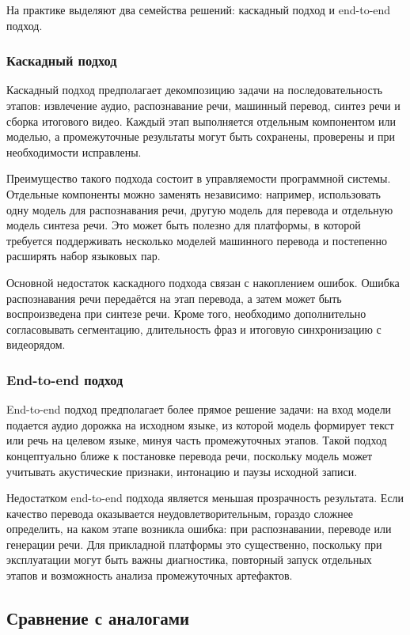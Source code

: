\documentclass[a4paper,article,14pt]{extarticle}
\begin{document}
На практике выделяют два семейства решений: каскадный подход и end-to-end подход.

\subsubsection{Каскадный подход}

Каскадный подход предполагает декомпозицию задачи на последовательность этапов: извлечение аудио, распознавание речи, машинный перевод, синтез речи и сборка итогового видео. Каждый этап выполняется отдельным компонентом или моделью, а промежуточные результаты могут быть сохранены, проверены и при необходимости исправлены.

Преимущество такого подхода состоит в управляемости программной системы. Отдельные компоненты можно заменять независимо: например, использовать одну модель для распознавания речи, другую модель для перевода и отдельную модель синтеза речи. Это может быть полезно для платформы, в которой требуется поддерживать несколько моделей машинного перевода и постепенно расширять набор языковых пар.

Основной недостаток каскадного подхода связан с накоплением ошибок. Ошибка распознавания речи передаётся на этап перевода, а затем может быть воспроизведена при синтезе речи. Кроме того, необходимо дополнительно согласовывать сегментацию, длительность фраз и итоговую синхронизацию с видеорядом.

\subsubsection{End-to-end подход}

End-to-end подход предполагает более прямое решение задачи: на вход модели подается аудио дорожка на исходном языке, из которой модель формирует текст или речь на целевом языке, минуя часть промежуточных этапов. Такой подход концептуально ближе к постановке перевода речи, поскольку модель может учитывать акустические признаки, интонацию и паузы исходной записи.

Недостатком end-to-end подхода является меньшая прозрачность результата. Если качество перевода оказывается неудовлетворительным, гораздо сложнее определить, на каком этапе возникла ошибка: при распознавании, переводе или генерации речи. Для прикладной платформы это существенно, поскольку при эксплуатации могут быть важны диагностика, повторный запуск отдельных этапов и возможность анализа промежуточных артефактов.

\subsection{Сравнение с аналогами}
\end{document}
